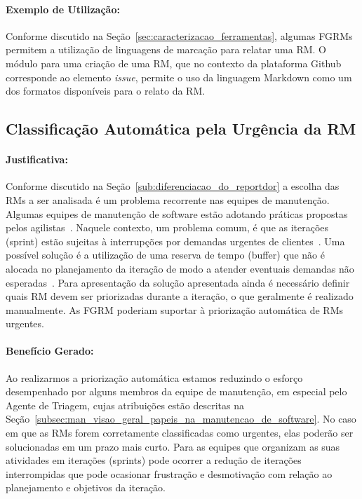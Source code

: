 \paragraph{Exemplo de Utilização:}
\label{par:exemplo_de_utilização_s06}

Conforme discutido na Seção~\ref{sec:caracterizacao_ferramentas}, algumas FGRMs
permitem a utilização de linguagens de marcação para relatar uma RM\@. O módulo
para uma criação de uma RM, que no contexto da plataforma Github corresponde ao
elemento \textit{issue}, permite o uso da linguagem Markdown como um dos
formatos disponíveis para o relato da RM\@.

\subsection{Classificação Automática pela Urgência da RM}
\label{sub:priorizacao_automatica_rms}


\paragraph{Justificativa:}
\label{par:justificativa_s07}

Conforme discutido na Seção~\ref{sub:diferenciacao_do_reportdor} a escolha das
RMs a ser analisada é um problema recorrente nas equipes de manutenção. Algumas
equipes de manutenção de software estão adotando práticas propostas pelos
agilistas~\cite{svensson2005introducing}. Naquele contexto, um problema
comum, é que as iterações (sprint) estão sujeitas à interrupções por demandas
urgentes de clientes~\cite{bennett2000software}. Uma possível solução é a
utilização de uma reserva de tempo (buffer) que não é alocada no planejamento da
iteração de modo a atender eventuais demandas não
esperadas~\cite{schwaber2002agile}. Para apresentação da solução apresentada
ainda é necessário definir quais RM devem ser priorizadas durante a iteração, o
que geralmente é realizado manualmente. As FGRM poderiam suportar à priorização
automática de RMs urgentes.

\paragraph{Benefício Gerado:}
\label{par:papéis_afetados_s07}

Ao realizarmos a priorização automática estamos reduzindo o esforço desempenhado
por alguns membros da equipe de manutenção, em especial pelo Agente de Triagem,
cujas atribuições estão descritas na
Seção~\ref{subsec:man_visao_geral_papeis_na_manutencao_de_software}. No caso em
que as RMs forem corretamente classificadas como urgentes, elas poderão ser
solucionadas em um prazo mais curto. Para as equipes que organizam as suas
atividades em iterações (sprints) pode ocorrer a redução de iterações
interrompidas que pode ocasionar frustração e desmotivação com relação ao
planejamento e objetivos da iteração.

